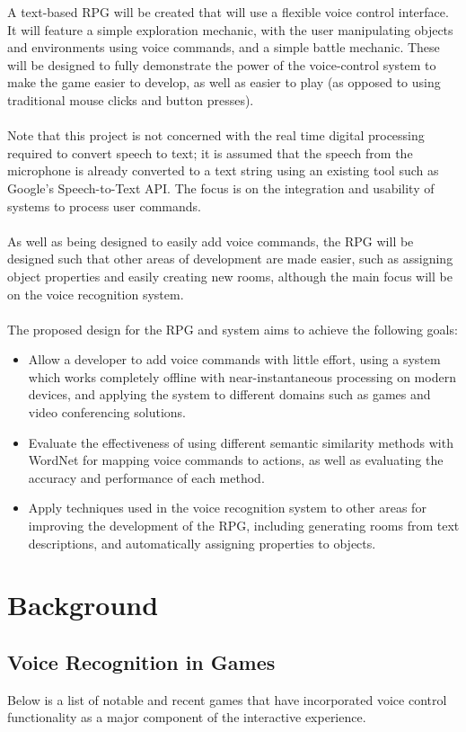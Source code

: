 \documentclass[11pt]{article}
\begin{document}
A text-based RPG will be created that will use a flexible voice control interface. It will feature a simple exploration mechanic, with the user manipulating objects and environments using voice commands, and a simple battle mechanic. These will be designed to fully demonstrate the power of the voice-control system to make the game easier to develop, as well as easier to play (as opposed to using traditional mouse clicks and button presses).
\\
\\
Note that this project is not concerned with the real time digital processing required to convert speech to text; it is assumed that the speech from the microphone is already converted to a text string using an existing tool such as Google's Speech-to-Text API. The focus is on the integration and usability of systems to process user commands.
\\
\\
As well as being designed to easily add voice commands, the RPG will be designed such that other areas of development are made easier, such as assigning object properties and easily creating new rooms, although the main focus will be on the voice recognition system.
\\
\\
The proposed design for the RPG and system aims to achieve the following goals:
\begin{itemize}
\item Allow a developer to add voice commands with little effort, using a system which works completely offline with near-instantaneous processing on modern devices, and applying the system to different domains such as games and video conferencing solutions.
\item Evaluate the effectiveness of using different semantic similarity methods with WordNet for mapping voice commands to actions, as well as evaluating the accuracy and performance of each method.
\item Apply techniques used in the voice recognition system to other areas for improving the development of the RPG, including generating rooms from text descriptions, and automatically assigning properties to objects.
\end{itemize}

\newpage
\section{Background}

\subsection{Voice Recognition in Games}
Below is a list of notable and recent games that have incorporated voice control functionality as a major component of the interactive experience.
\end{document}

